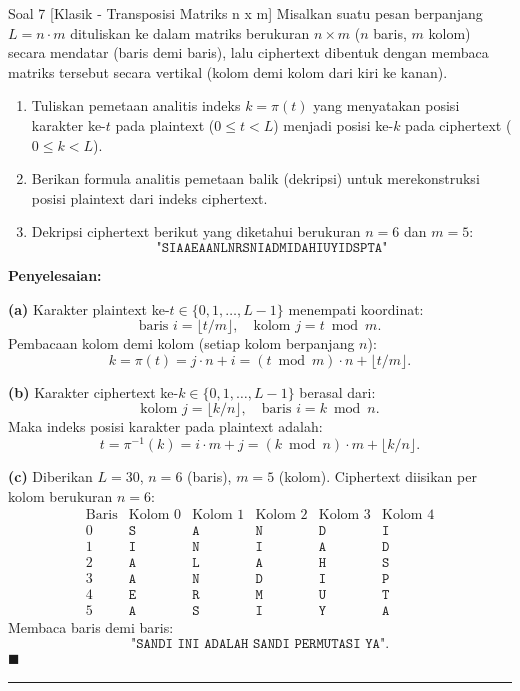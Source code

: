 \documentclass[11pt,a4paper]{article}
\newenvironment{solusi}{\noindent\textbf{\textsf{Penyelesaian:}}\par\vspace{0.2em}}{\hfill$\blacksquare$\vspace{1em}\par\hrule\vspace{1em}}
\begin{document}
\begin{soalklasik}{Soal 7 [Klasik - Transposisi Matriks n x m]}
Misalkan suatu pesan berpanjang $L = n \cdot m$ dituliskan ke dalam matriks berukuran $n \times m$ ($n$ baris, $m$ kolom) secara mendatar (baris demi baris), lalu ciphertext dibentuk dengan membaca matriks tersebut secara vertikal (kolom demi kolom dari kiri ke kanan).
\begin{enumerate}[label=(\alph*)]
    \item Tuliskan pemetaan analitis indeks $k = \pi(t)$ yang menyatakan posisi karakter ke-$t$ pada plaintext ($0 \le t < L$) menjadi posisi ke-$k$ pada ciphertext ($0 \le k < L$).
    \item Berikan formula analitis pemetaan balik (dekripsi) untuk merekonstruksi posisi plaintext dari indeks ciphertext.
    \item Dekripsi ciphertext berikut yang diketahui berukuran $n = 6$ dan $m = 5$:
    \[
    \texttt{"SIAAEAANLNRSNIADMIDAHIUYIDSPTA"}
    \]
\end{enumerate}
\end{soalklasik}

\begin{solusi}
\textbf{(a)} Karakter plaintext ke-$t \in \{0, 1, \dots, L-1\}$ menempati koordinat:
\[
\text{baris } i = \lfloor t / m \rfloor, \quad \text{kolom } j = t \bmod m.
\]
Pembacaan kolom demi kolom (setiap kolom berpanjang $n$):
\[
k = \pi(t) = j \cdot n + i = (t \bmod m) \cdot n + \lfloor t / m \rfloor.
\]

\textbf{(b)} Karakter ciphertext ke-$k \in \{0, 1, \dots, L-1\}$ berasal dari:
\[
\text{kolom } j = \lfloor k / n \rfloor, \quad \text{baris } i = k \bmod n.
\]
Maka indeks posisi karakter pada plaintext adalah:
\[
t = \pi^{-1}(k) = i \cdot m + j = (k \bmod n) \cdot m + \lfloor k / n \rfloor.
\]

\textbf{(c)} Diberikan $L = 30$, $n = 6$ (baris), $m = 5$ (kolom).
Ciphertext diisikan per kolom berukuran $n = 6$:
\[
\begin{array}{c|ccccc}
\text{Baris} & \text{Kolom } 0 & \text{Kolom } 1 & \text{Kolom } 2 & \text{Kolom } 3 & \text{Kolom } 4 \\ \hline
0 & \texttt{S} & \texttt{A} & \texttt{N} & \texttt{D} & \texttt{I} \\
1 & \texttt{I} & \texttt{N} & \texttt{I} & \texttt{A} & \texttt{D} \\
2 & \texttt{A} & \texttt{L} & \texttt{A} & \texttt{H} & \texttt{S} \\
3 & \texttt{A} & \texttt{N} & \texttt{D} & \texttt{I} & \texttt{P} \\
4 & \texttt{E} & \texttt{R} & \texttt{M} & \texttt{U} & \texttt{T} \\
5 & \texttt{A} & \texttt{S} & \texttt{I} & \texttt{Y} & \texttt{A}
\end{array}
\]
Membaca baris demi baris:
\[
\texttt{"SANDI INI ADALAH SANDI PERMUTASI YA"}.
\]
\end{solusi}
\end{document}
